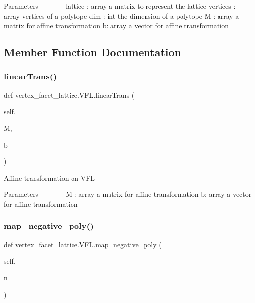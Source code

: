 \begin{DoxyVerb}Parameters
----------
lattice : array
    a matrix to represent the lattice
vertices : array
    vertices of a polytope
dim : int
    the dimension of a polytope
M : array
    a matrix for affine transformation
b: array
    a vector for affine transformation
\end{DoxyVerb}
 

\subsection{Member Function Documentation}
\mbox{\label{classvertex__facet__lattice_1_1VFL_ac24a7e3a7c2b5fd64b9b64dee65aa762}} 
\subsubsection{\texorpdfstring{linear\+Trans()}{linearTrans()}}
{\footnotesize\ttfamily def vertex\+\_\+facet\+\_\+lattice.\+V\+F\+L.\+linear\+Trans (\begin{DoxyParamCaption}\item[{}]{self,  }\item[{}]{M,  }\item[{}]{b }\end{DoxyParamCaption})}

\begin{DoxyVerb}Affine transformation on VFL

Parameters
----------
M : array
    a matrix for affine transformation
b: array
    a vector for affine transformation
\end{DoxyVerb}
 \mbox{\label{classvertex__facet__lattice_1_1VFL_ae9e7eb17406dc576a544decaec956bbc}} 
\subsubsection{\texorpdfstring{map\+\_\+negative\+\_\+poly()}{map\_negative\_poly()}}
{\footnotesize\ttfamily def vertex\+\_\+facet\+\_\+lattice.\+V\+F\+L.\+map\+\_\+negative\+\_\+poly (\begin{DoxyParamCaption}\item[{}]{self,  }\item[{}]{n }\end{DoxyParamCaption})}

